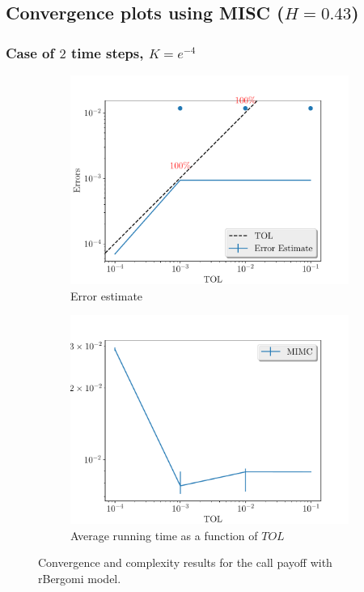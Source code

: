 \documentclass[11pt]{article}
\begin{document}
\newpage
\subsection{Convergence plots using MISC ($H=0.43$)}\label{sec:Convergence plots using MISC_H_043}
\newpage
\subsubsection*{Case of $2$ time steps, $K=e^{-4}$}
\begin{figure}[!h]
	\centering
	\begin{subfigure}{.5\textwidth}
		\centering
		\includegraphics[width=1\linewidth]{./figures/rbergomi_2_steps_K_e__4/error_estimate.pdf}
		\caption{Error estimate}
		\label{fig:misc_rbergomi_2_steps_sub1}
	\end{subfigure}%
	\begin{subfigure}{.5\textwidth}
		\centering
		\includegraphics[width=1\linewidth]{./figures/rbergomi_2_steps_K_e__4/average_running_time.pdf}
		\caption{Average running time as a function of $TOL$}
		\label{fig:misc_rbergomi_2_steps_sub2}
	\end{subfigure}%
	\caption{Convergence and complexity results for the call payoff with rBergomi model.}
	\label{fig:misc_rbergomi_2_steps_1}
\end{figure}
\end{document}
